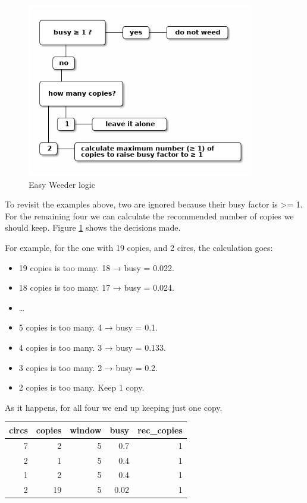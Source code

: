 \documentclass[11pt]{article}
\begin{document}
\begin{figure}[htbp]
\centering
\includegraphics[height=3in]{logic-flow.png}
\caption{\label{fig:orge37fded}
Easy Weeder logic}
\end{figure}

To revisit the examples above, two are ignored because their busy factor is >= 1.  For the remaining four we can calculate the recommended number of copies we should keep.  Figure \ref{fig:orge37fded} shows the decisions made.

For example, for the one with 19 copies, and 2 circs, the calculation goes:

\begin{itemize}
\item 19 copies is too many.  18 → busy = 0.022.
\item 18 copies is too many.  17 → busy = 0.024.
\item …
\item 5 copies is too many.  4 → busy = 0.1.
\item 4 copies is too many.  3 → busy = 0.133.
\item 3 copies is too many.  2 → busy = 0.2.
\item 2 copies is too many. Keep 1 copy.
\end{itemize}

As it happens, for all four we end up keeping just one copy.

\begin{center}
\begin{tabular}{rrrrr}
circs & copies & window & busy & rec\_copies\\
\hline
7 & 2 & 5 & 0.7 & 1\\
2 & 1 & 5 & 0.4 & 1\\
1 & 2 & 5 & 0.4 & 1\\
2 & 19 & 5 & 0.02 & 1\\
\end{tabular}
\end{center}
\end{document}
